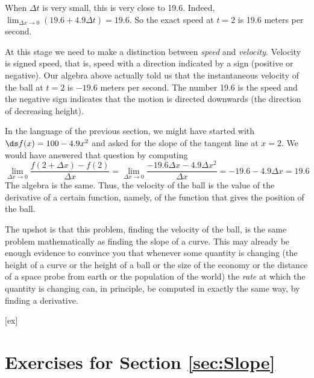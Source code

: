 When $\Delta t$ is very small, this is very close to 19.6. Indeed,
$\lim_{\Delta x\to 0}(19.6+4.9\Delta t)=19.6$. So the exact speed at $t=2$ is 19.6 meters per second.

At this stage we need to make a distinction between \textit{speed} and
\textit{velocity}. Velocity is signed speed, that is, speed with a
direction indicated by a sign (positive or negative). Our algebra
above actually told us that the instantaneous velocity of the ball at $t=2$ is
$-19.6$ meters per second. The number 19.6 is the speed and the
negative sign indicates that the motion is directed downwards (the
direction of decreasing height).

In the language of the previous section, we might have started with
$\ds f(x)=100-4.9x^2$ and asked for the slope of the tangent line at
$x=2$. We would have answered that question by computing $$
\lim_{\Delta x\to 0}\frac{f(2+\Delta x) - f(2)}{\Delta x}
=\lim_{\Delta x\to 0}\frac{-19.6\Delta x-4.9\Delta x^2}{\Delta x}
=-19.6-4.9\Delta x=19.6
$$ 
The algebra is the same. Thus, the velocity of the ball is the value
of the derivative of a certain function, namely, of the function that
gives the position of the ball.

The upshot is that this problem, finding the velocity of the ball, is
 the same problem mathematically as finding the slope
of a curve. This may already be enough evidence to convince you that
whenever some quantity is changing (the height of a curve or the
height of a ball or the size of the economy or the distance of a space
probe from earth or the population of the world) the \textit{rate} at which the
quantity is changing can, in principle, be computed in exactly the
same way, by finding a derivative.

[ex]
\section*{Exercises for Section \ref{sec:Slope}}

